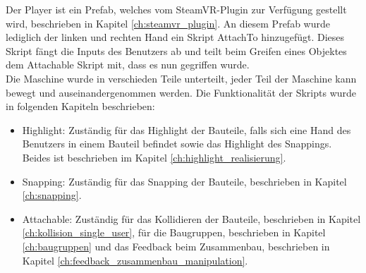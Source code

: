 Der \grqq Player\grqq{} ist ein Prefab, welches vom SteamVR-Plugin zur Verfügung gestellt wird, beschrieben in Kapitel \ref{ch:steamvr_plugin}. An diesem Prefab wurde lediglich der linken und rechten Hand ein Skript \grqq AttachTo\grqq{} hinzugefügt. Dieses Skript fängt die Inputs des Benutzers ab und teilt beim Greifen eines Objektes dem \grqq Attachable\grqq{} Skript mit, dass es nun gegriffen wurde. \\

\noindent Die Maschine wurde in verschieden Teile unterteilt, jeder Teil der Maschine kann bewegt und auseinandergenommen werden. Die Funktionalität der Skripts wurde in folgenden Kapiteln beschrieben:

\begin{itemize} [itemsep=1pt,topsep=0pt]	
	\item Highlight: Zuständig für das Highlight der Bauteile, falls sich eine Hand des Benutzers in einem Bauteil befindet sowie das Highlight des Snappings. Beides ist beschrieben im Kapitel \ref{ch:highlight_realisierung}.
	
	\item Snapping: Zuständig für das Snapping der Bauteile, beschrieben in Kapitel \ref{ch:snapping}.
	
	\item Attachable: Zuständig für das Kollidieren der Bauteile, beschrieben in Kapitel \ref{ch:kollision_single_user}, für die Baugruppen, beschrieben in Kapitel \ref{ch:baugruppen} und das Feedback beim Zusammenbau, beschrieben in Kapitel \ref{ch:feedback_zusammenbau_manipulation}.
\end{itemize}
